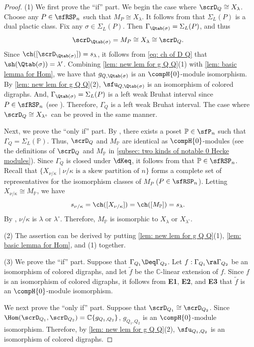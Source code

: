 \documentclass[12pt, reqno]{amsart}
\theoremstyle{plain}
\theoremstyle{definition}
\numberwithin{equation}{section}
\numberwithin{figure}{section}
\numberwithin{table}{section}
\def\C{\mathbb C}
\newcommand{\tf}{\widetilde{f}}
\begin{document}
\begin{proof}
(1) We first prove the ``if'' part.
We begin the case where $\scrD_{Q} \cong X_{\lambda}$.
Choose any $P \in \sfRSP_n$ such that $M_{P} \cong X_{\lambda}$.
It follows from \cite[Theorem 6.4]{23KLO} that $\Sigma_L(P)$ is a dual plactic class.  
Fix any $\sigma \in \Sigma_L(P)$.
Then $\Gamma_{\Qtab(\sigma)} = \Sigma_L(P)$, and thus
\[
\scrD_{\Qtab(\sigma)} = M_{P}  \cong X_{\lambda} \cong \scrD_Q.
\]
Since $\ch([\scrD_{\Qtab(\sigma)}]) = s_{\lambda}$, it follows from \cref{eq: ch of D Q} that  $\sh(\Qtab(\sigma)) = \lambda'$.
Combining \cref{lem: new lem for g Q Q}(1) with  \cref{lem: basic lemma for Hom}, we have that  $g_{Q, \Qtab(\sigma)}$ is an $\compH{0}$-module isomorphism.
By \cref{lem: new lem for g Q Q}(2), $\sfu_{Q, \Qtab(\sigma)}$ is an isomorphism of colored digraphs.
And,  $\Gamma_{\Qtab(\sigma)} = \Sigma_L(P)$ is a left weak Bruhat interval since $P \in \sfRSP_n$ (see \cite[Theorem 6.8]{91BW}).
Therefore, $\Gamma_{Q}$ is a left weak Bruhat interval.
The case where  $\scrD_{Q} \cong X_{\lambda^\circ}$  can be proved in the same manner.




Next, we prove the ``only if'' part.
By \cite[Theorem 6.8]{91BW}, there exists a poset $\mathbb{P} \in \sfP_n$ such that  $\Gamma_Q = \Sigma_L(\mathbb{P})$.
Thus, $\scrD_{Q}$ and $M_{\mathbb{P}}$ are identical as  $\compH{0}$-modules (see  the definitions of $\scrD_Q$ and $M_{\mathbb{P}}$ in \cref{subsec: two kinds of notable 0 Hecke modules}).
Since $\Gamma_Q$ is  closed under $\dKeq$, it follows from \cite[Theorem 6.4]{23KLO} that $\mathbb{P} \in \sfRSP_n$.
Recall that $\{X_{\nu/\kappa} \mid \nu/\kappa \text{ is a skew partition of $n$}\}$ forms a complete set of representatives for the isomorphism classes of $M_{P}$ ($P \in \sfRSP_n$).
Letting $X_{\nu/\kappa} \cong M_{\mathbb{P}}$, we have
\[
s_{\nu/\kappa} 
= \ch([X_{\nu/\kappa}])
= \ch([M_{\mathbb{P}}])
= s_{\lambda}. 
\]
By \cite[Theorem 2.2]{05W}, $\nu/\kappa$ is $\lambda$ or $\lambda^\circ$.
Therefore, $M_{\mathbb{P}}$ is isomorphic to $X_{\lambda}$ or $X_{\lambda^\circ}$.


(2) The assertion can be derived by putting   \cref{lem: new lem for g Q Q}(1),  \cref{lem: basic lemma for Hom}, and (1) together.






(3) We prove the ``if'' part. 
Suppose that $\Gamma_{Q_1} \Deq \Gamma_{Q_2}$.
Let $f: \Gamma_{Q_1} \ra \Gamma_{Q_2}$ be an isomorphism of colored digraphs, and let $\tf$ be the $\C$-linear extension of $f$.
Since $f$ is an isomorphism of colored digraphs, it follows from \textbf{E1}, \textbf{E2}, and \textbf{E3} that $\tf$ is an $\compH{0}$-module isomorphism. 

We next prove the ``only if'' part.
Suppose that $\scrD_{Q_1} \cong \scrD_{Q_2}$.
Since $\Hom(\scrD_{Q_1}, \scrD_{Q_2}) = \C\{g_{Q_1, Q_2}\}$, $g_{Q_1, Q_2}$ is an $\compH{0}$-module isomorphism.
Therefore, by \cref{lem: new lem for g Q Q}(2), $\sfu_{Q_1, Q_2}$ is an isomorphism of colored digraphs.
\end{proof}
\end{document}

